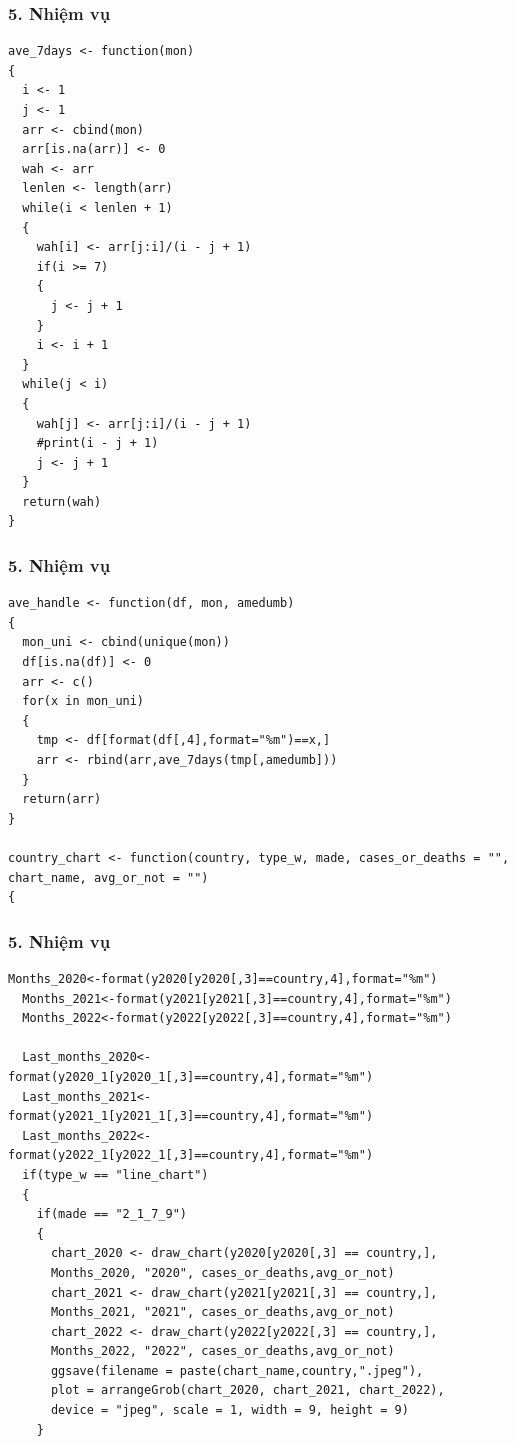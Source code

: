 \documentclass[english,10pt,table]{beamer}
\begin{document}
\begin{frame}[fragile]
\frametitle{5.  Nhiệm vụ}
\begin{lstlisting}[frame = single,basicstyle=\tiny]
ave_7days <- function(mon)
{
  i <- 1
  j <- 1
  arr <- cbind(mon)
  arr[is.na(arr)] <- 0
  wah <- arr
  lenlen <- length(arr)
  while(i < lenlen + 1)
  {
    wah[i] <- arr[j:i]/(i - j + 1)
    if(i >= 7)
    {
      j <- j + 1
    }
    i <- i + 1
  }
  while(j < i)
  {
    wah[j] <- arr[j:i]/(i - j + 1)
    #print(i - j + 1)
    j <- j + 1
  }
  return(wah)
}
\end{lstlisting}
\end{frame}

\begin{frame}[fragile]
\frametitle{5.  Nhiệm vụ}
\begin{lstlisting}[frame = single,basicstyle=\tiny]
ave_handle <- function(df, mon, amedumb)
{
  mon_uni <- cbind(unique(mon))
  df[is.na(df)] <- 0
  arr <- c()
  for(x in mon_uni)
  {
    tmp <- df[format(df[,4],format="%m")==x,]
    arr <- rbind(arr,ave_7days(tmp[,amedumb]))
  }
  return(arr)
}

country_chart <- function(country, type_w, made, cases_or_deaths = "", 
chart_name, avg_or_not = "")
{
\end{lstlisting}
\end{frame}

\begin{frame}[fragile]
\frametitle{5.  Nhiệm vụ}
\begin{lstlisting}[frame = single,basicstyle=\tiny]
Months_2020<-format(y2020[y2020[,3]==country,4],format="%m")
  Months_2021<-format(y2021[y2021[,3]==country,4],format="%m")
  Months_2022<-format(y2022[y2022[,3]==country,4],format="%m")
  
  Last_months_2020<-format(y2020_1[y2020_1[,3]==country,4],format="%m")
  Last_months_2021<-format(y2021_1[y2021_1[,3]==country,4],format="%m")
  Last_months_2022<-format(y2022_1[y2022_1[,3]==country,4],format="%m")
  if(type_w == "line_chart")
  {
    if(made == "2_1_7_9")
    {
      chart_2020 <- draw_chart(y2020[y2020[,3] == country,], 
      Months_2020, "2020", cases_or_deaths,avg_or_not)
      chart_2021 <- draw_chart(y2021[y2021[,3] == country,], 
      Months_2021, "2021", cases_or_deaths,avg_or_not)
      chart_2022 <- draw_chart(y2022[y2022[,3] == country,], 
      Months_2022, "2022", cases_or_deaths,avg_or_not)
      ggsave(filename = paste(chart_name,country,".jpeg"), 
      plot = arrangeGrob(chart_2020, chart_2021, chart_2022), 
      device = "jpeg", scale = 1, width = 9, height = 9)
    }
\end{lstlisting}
\end{frame}
\end{document}
